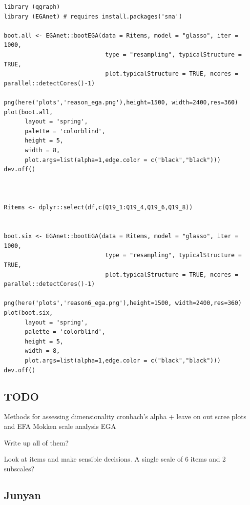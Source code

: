 \documentclass[
  ,jou,floatsintext]{apa6}
\begin{document}
\begin{verbatim}
library (qgraph)
library (EGAnet) # requires install.packages('sna')

boot.all <- EGAnet::bootEGA(data = Ritems, model = "glasso", iter = 1000,
                             type = "resampling", typicalStructure = TRUE, 
                             plot.typicalStructure = TRUE, ncores = parallel::detectCores()-1)

png(here('plots','reason_ega.png'),height=1500, width=2400,res=360)
plot(boot.all, 
      layout = 'spring', 
      palette = 'colorblind', 
      height = 5, 
      width = 8,
      plot.args=list(alpha=1,edge.color = c("black","black")))
dev.off()



Ritems <- dplyr::select(df,c(Q19_1:Q19_4,Q19_6,Q19_8))


boot.six <- EGAnet::bootEGA(data = Ritems, model = "glasso", iter = 1000,
                             type = "resampling", typicalStructure = TRUE, 
                             plot.typicalStructure = TRUE, ncores = parallel::detectCores()-1)

png(here('plots','reason6_ega.png'),height=1500, width=2400,res=360)
plot(boot.six, 
      layout = 'spring', 
      palette = 'colorblind', 
      height = 5, 
      width = 8,
      plot.args=list(alpha=1,edge.color = c("black","black")))
dev.off()
\end{verbatim}

\hypertarget{todo}{%
\subsection{TODO}\label{todo}}

Methods for assessing dimensionality
cronbach's alpha + leave on out
scree plots and EFA
Mokken scale analysis
EGA

Write up all of them?

Look at items and make sensible decisions. A single scale of 6 items and 2 subscales?

\hypertarget{junyan}{%
\subsection{Junyan}\label{junyan}}
\end{document}
